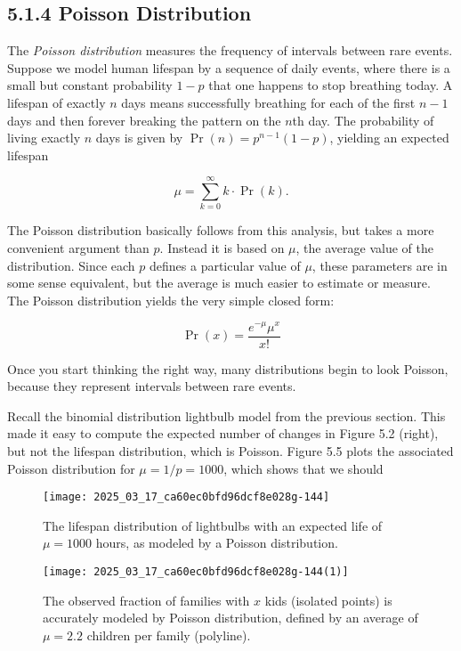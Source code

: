 \documentclass[10pt]{article}
\begin{document}
\subsection*{5.1.4 Poisson Distribution}
The \emph{Poisson distribution} measures the frequency of intervals between rare events. Suppose we model human lifespan by a sequence of daily events, where there is a small but constant probability $1-p$ that one happens to stop breathing today. A lifespan of exactly $n$ days means successfully breathing for each of the first $n-1$ days and then forever breaking the pattern on the $n$th day. The probability of living exactly $n$ days is given by $\operatorname{Pr}(n)=p^{n-1}(1-p)$, yielding an expected lifespan

\[
\mu=\sum_{k=0}^{\infty} k \cdot \operatorname{Pr}(k).
\]

The Poisson distribution basically follows from this analysis, but takes a more convenient argument than $p$. Instead it is based on $\mu$, the average value of the distribution. Since each $p$ defines a particular value of $\mu$, these parameters are in some sense equivalent, but the average is much easier to estimate or measure. The Poisson distribution yields the very simple closed form:

\[
\operatorname{Pr}(x)=\frac{e^{-\mu} \mu^{x}}{x!}
\]

Once you start thinking the right way, many distributions begin to look Poisson, because they represent intervals between rare events.

Recall the binomial distribution lightbulb model from the previous section. This made it easy to compute the expected number of changes in Figure 5.2 (right), but not the lifespan distribution, which is Poisson. Figure 5.5 plots the associated Poisson distribution for $\mu=1 / p=1000$, which shows that we should\\
\begin{figure}[h]
\centering
\texttt{[image: 2025\_03\_17\_ca60ec0bfd96dcf8e028g-144]}
\caption{The lifespan distribution of lightbulbs with an expected life of $\mu= 1000$ hours, as modeled by a Poisson distribution.}
\end{figure}

\begin{figure}[h]
\centering
\texttt{[image: 2025\_03\_17\_ca60ec0bfd96dcf8e028g-144(1)]}
\caption{The observed fraction of families with $x$ kids (isolated points) is accurately modeled by Poisson distribution, defined by an average of $\mu=2.2$ children per family (polyline).}
\end{figure}
\end{document}
